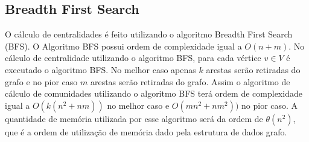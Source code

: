 \subsection{Breadth First Search}\label{sec:bfs}
O cálculo de centralidades é feito utilizando o algoritmo Breadth First Search (BFS). O Algoritmo BFS
possui ordem de complexidade igual a $O(n + m)$. No cálculo de centralidade utilizando o algoritmo BFS, 
para cada vértice $v \in V$ é executado o algoritmo BFS. No melhor caso apenas $k$ arestas serão retiradas do grafo e no pior
caso $m$ arestas serão retiradas do grafo. Assim o algoritmo de cálculo de comunidades utilizando o algoritmo BFS terá ordem de complexidade igual a $O(k(n^2 + nm))$ no melhor caso e $O(mn^2 + nm^2))$ no pior caso. A quantidade
de memória utilizada por esse algoritmo será da ordem de $\theta(n^2)$, que é a ordem de utilização de memória dado pela estrutura
de dados grafo.